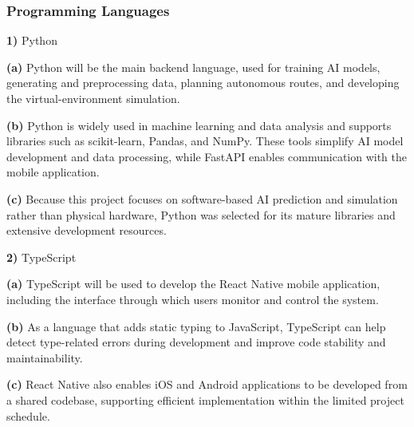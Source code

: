 \documentclass[conference]{IEEEtran}
\begin{document}
\subsubsection{Programming Languages}
\par\noindent\textbf{1)} Python
\par\noindent\textbf{(a)} Python will be the main backend language, used for training AI models, generating and preprocessing data, planning autonomous routes, and developing the virtual-environment simulation.
\par\noindent\textbf{(b)} Python is widely used in machine learning and data analysis and supports libraries such as scikit-learn, Pandas, and NumPy. These tools simplify AI model development and data processing, while FastAPI enables communication with the mobile application.
\par\noindent\textbf{(c)} Because this project focuses on software-based AI prediction and simulation rather than physical hardware, Python was selected for its mature libraries and extensive development resources.
\par\noindent\textbf{2)} TypeScript
\par\noindent\textbf{(a)} TypeScript will be used to develop the React Native mobile application, including the interface through which users monitor and control the system.
\par\noindent\textbf{(b)} As a language that adds static typing to JavaScript, TypeScript can help detect type-related errors during development and improve code stability and maintainability.
\par\noindent\textbf{(c)} React Native also enables iOS and Android applications to be developed from a shared codebase, supporting efficient implementation within the limited project schedule.
\end{document}
